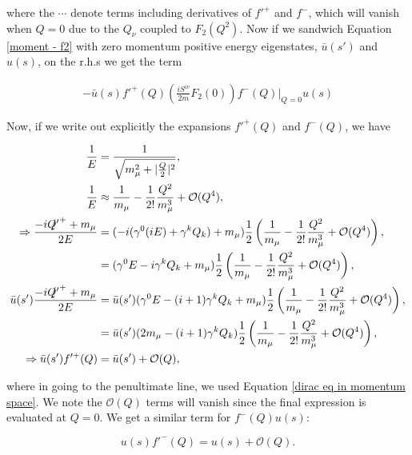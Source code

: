 \documentclass{article}
\numberwithin{equation}{section} %
\begin{document}
\noindent where the $\cdots$ denote terms including derivatives of $f'^+$ and $f^-$, which will vanish when $Q=0$ due to the $Q_\nu$ coupled to $F_2(Q^2)$. Now if we sandwich Equation \ref{moment - f2} with zero momentum positive energy eigenstates, $\bar{u}(s')$ and $u(s)$, on the r.h.s we get the term

\begin{equation}
\begin{split}
-\bar{u}(s)f'^+(Q)\left( \frac{iS^{i\nu}}{2m}F_2(0)\right)f^-(Q)\bigg\vert_{Q=0} u(s)
\end{split}
\end{equation}

Now, if we write out explicitly the expansions $f'^+(Q)$ and $f^-(Q)$, we have

\begin{equation}
\begin{split}
\frac{1}{E} &= \frac{1}{\sqrt{m_\mu^2 + |\frac{Q}{2}|^2}},\\
\frac{1}{E} &\approx \frac{1}{m_\mu} -\frac{1}{2!}\frac{Q^2}{m_\mu^3} + \mathcal{O}(Q^4),\\
\Rightarrow\frac{-i\slashed{Q'}^++m_\mu}{2E} &= (-i(\gamma^0(iE) + \gamma^kQ_k) +m_\mu)\frac{1}{2}\left(\frac{1}{m_\mu} -\frac{1}{2!}\frac{Q^2}{m_\mu^3} + \mathcal{O}(Q^4)\right),\\
&= (\gamma^0E - i\gamma^kQ_k +m_\mu)\frac{1}{2}\left(\frac{1}{m_\mu} -\frac{1}{2!}\frac{Q^2}{m_\mu^3} + \mathcal{O}(Q^4)\right),\\
\bar{u}(s')\frac{-i\slashed{Q'}^++m_\mu}{2E} &= \bar{u}(s')(\gamma^0E - (i+1)\gamma^kQ_k +m_\mu)\frac{1}{2}\left(\frac{1}{m_\mu} -\frac{1}{2!}\frac{Q^2}{m_\mu^3} + \mathcal{O}(Q^4)\right),\\
&= \bar{u}(s')(2m_\mu - (i+1)\gamma^kQ_k)\frac{1}{2}\left(\frac{1}{m_\mu} -\frac{1}{2!}\frac{Q^2}{m_\mu^3} + \mathcal{O}(Q^4)\right),\\
\Rightarrow \bar{u}(s')f'^+(Q)&= \bar{u}(s')+\mathcal{O}(Q),\\
\end{split}
\end{equation}

\noindent where in going to the penultimate line, we used Equation \ref{dirac eq in momentum space}. We note the $\mathcal{O}(Q)$ terms will vanish since the final expression is evaluated at $Q=0$. We get a similar term for $f^-(Q)u(s)$:

\begin{equation}
u(s)f'^-(Q)= u(s)+\mathcal{O}(Q).
\end{equation}
\end{document}
